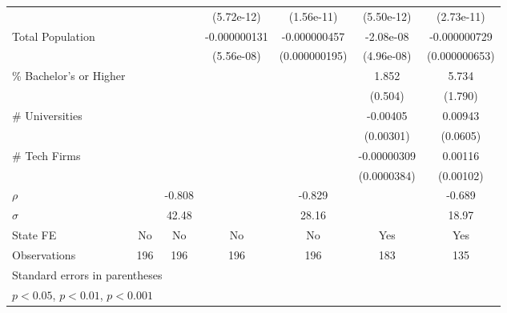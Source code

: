 {\begin{tabular}{l*{6}{c}}
                    &                     &                     &  (5.72e-12)         &  (1.56e-11)         &  (5.50e-12)         &  (2.73e-11)         \\
\addlinespace
Total Population    &                     &                     &-0.000000131\sym{*}  &-0.000000457\sym{*}  &   -2.08e-08         &-0.000000729         \\
                    &                     &                     &  (5.56e-08)         &(0.000000195)         &  (4.96e-08)         &(0.000000653)         \\
\addlinespace
\% Bachelor's or Higher&                     &                     &                     &                     &       1.852\sym{***}&       5.734\sym{**} \\
                    &                     &                     &                     &                     &     (0.504)         &     (1.790)         \\
\addlinespace
\# Universities     &                     &                     &                     &                     &    -0.00405         &     0.00943         \\
                    &                     &                     &                     &                     &   (0.00301)         &    (0.0605)         \\
\addlinespace
\# Tech Firms       &                     &                     &                     &                     & -0.00000309         &     0.00116         \\
                    &                     &                     &                     &                     & (0.0000384)         &   (0.00102)         \\
\midrule
\(\rho\)            &                     &      -0.808         &                     &      -0.829         &                     &      -0.689         \\
\(\sigma\)          &                     &       42.48         &                     &       28.16         &                     &       18.97         \\
State FE            &          No         &          No         &          No         &          No         &         Yes         &         Yes         \\
Observations        &         196         &         196         &         196         &         196         &         183         &         135         \\
\bottomrule
\multicolumn{7}{l}{\footnotesize Standard errors in parentheses}\\
\multicolumn{7}{l}{\footnotesize \sym{*} \(p<0.05\), \sym{**} \(p<0.01\), \sym{***} \(p<0.001\)}\\
\end{tabular}
}
